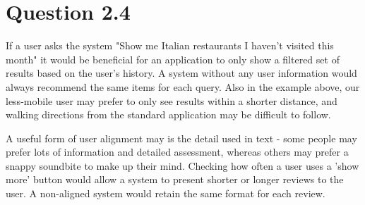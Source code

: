 \documentclass[a4paper,11pt,oneside]{article}
\begin{document}
\section{Question 2.4}
If a user asks the system "Show me Italian restaurants I haven't visited this month" it would be beneficial for an application to only show a filtered set of results based on the user's history. A system without any user information would always recommend the same items for each query. Also in the example above, our less-mobile user may prefer to only see results within a shorter distance, and walking directions from the standard application may be difficult to follow.

A useful form of user alignment may is the detail used in text - some people may prefer lots of information and detailed assessment, whereas others may prefer a snappy soundbite to make up their mind. Checking how often a user uses a 'show more' button would allow a system to present shorter or longer reviews to the user. A non-aligned system would retain the same format for each review.
\end{document}
